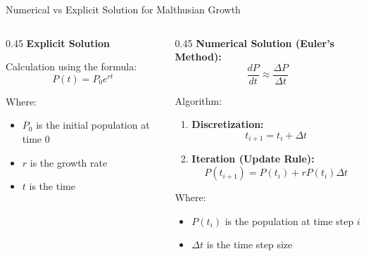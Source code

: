 \begin{frame}{Numerical vs Explicit Solution for Malthusian Growth}
\footnotesize

\begin{columns}
    \begin{column}{0.45\textwidth}
       \textbf{Explicit Solution}
       
       Calculation using the formula:
       \begin{equation*}
    P(t) = P_0 e^{rt} 
  \end{equation*}

  Where:
\begin{itemize}
    \item $P_0$ is the initial population at time $0$
    \item $r$ is the growth rate
    \item $t$ is the time
\end{itemize}

        
    \end{column}
    
  \hspace{1em}
\vrule{}
  \hspace{1em}

    \begin{column}{0.45\textwidth}
   \textbf{Numerical Solution (Euler's Method):}  
   \begin{equation*}
   \frac{dP}{dt} \approx \frac{\Delta P}{\Delta t}
\end{equation*}

\vspace{1em}
  Algorithm:
 \begin{enumerate}
     \item \textbf{Discretization:}
     \begin{equation*}
         t_{i+1} = t_i + \Delta t
     \end{equation*}
        \item \textbf{Iteration (Update Rule):}
     \begin{equation*}
         P(t_{i+1}) = P(t_i) + r P(t_i) \Delta t
     \end{equation*}
 \end{enumerate}
Where:
\begin{itemize}
    \item $P(t_i)$ is the population at time step $i$
    \item $\Delta t$ is the time step size
\end{itemize}
    \end{column}
\end{columns}
\end{frame}





